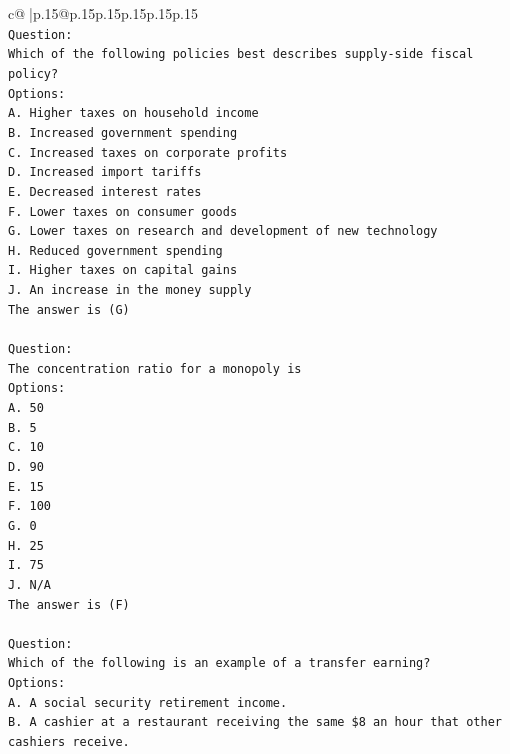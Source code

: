 \documentclass{article}
\begin{document}
{\begin{supertabular}{c@{$\;$}|p{.15\linewidth}@{}p{.15\linewidth}p{.15\linewidth}p{.15\linewidth}p{.15\linewidth}p{.15\linewidth}}
{{{\\ 
\texttt{Question:} \\
\texttt{Which of the following policies best describes supply{-}side fiscal policy?} \\
\texttt{Options:} \\
\texttt{A. Higher taxes on household income} \\
\texttt{B. Increased government spending} \\
\texttt{C. Increased taxes on corporate profits} \\
\texttt{D. Increased import tariffs} \\
\texttt{E. Decreased interest rates} \\
\texttt{F. Lower taxes on consumer goods} \\
\texttt{G. Lower taxes on research and development of new technology} \\
\texttt{H. Reduced government spending} \\
\texttt{I. Higher taxes on capital gains} \\
\texttt{J. An increase in the money supply} \\
\texttt{The answer is (G)} \\
\\ 
\texttt{Question:} \\
\texttt{The concentration ratio for a monopoly is} \\
\texttt{Options:} \\
\texttt{A. 50} \\
\texttt{B. 5} \\
\texttt{C. 10} \\
\texttt{D. 90} \\
\texttt{E. 15} \\
\texttt{F. 100} \\
\texttt{G. 0} \\
\texttt{H. 25} \\
\texttt{I. 75} \\
\texttt{J. N/A} \\
\texttt{The answer is (F)} \\
\\ 
\texttt{Question:} \\
\texttt{Which of the following is an example of a transfer earning?} \\
\texttt{Options:} \\
\texttt{A. A social security retirement income.} \\
\texttt{B. A cashier at a restaurant receiving the same \$8 an hour that other cashiers receive.} \\
}}}
\end{supertabular}}
\end{document}
